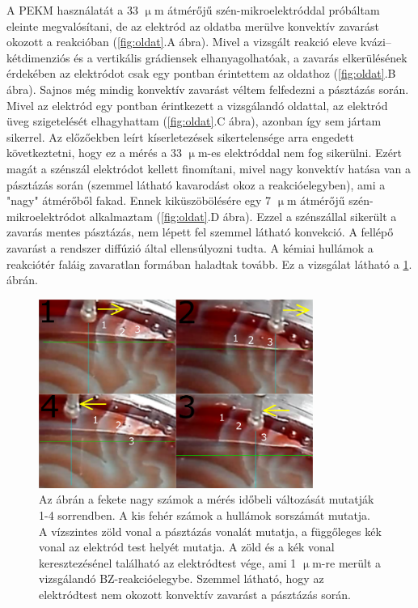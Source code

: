 A PEKM használatát a 33 $\upmu$m átmérőjű szén-mikroelektróddal próbáltam eleinte megvalósítani, de az elektród az oldatba merülve konvektív zavarást okozott a reakcióban (\ref{fig:oldat}.A ábra). Mivel a vizsgált reakció eleve kvázi--kétdimenziós és a vertikális grádiensek elhanyagolhatóak, a zavarás elkerülésének érdekében az elektródot csak egy pontban érintettem az oldathoz (\ref{fig:oldat}.B ábra). Sajnos még mindig konvektív zavarást véltem felfedezni a pásztázás során. Mivel az elektród egy pontban érintkezett a vizsgálandó oldattal, az elektród üveg szigetelését elhagyhattam (\ref{fig:oldat}.C ábra), azonban így sem jártam sikerrel. Az előzőekben leírt kíserletezések sikertelensége arra engedett következtetni, hogy ez a mérés a 33 $\upmu$m-es elektróddal nem fog sikerülni. Ezért magát a szénszál elektródot kellett finomítani, mivel nagy konvektív hatása van a pásztázás során (szemmel látható kavarodást okoz a reakcióelegyben), ami a "nagy" átmérőből fakad. Ennek kiküszöbölésére egy 7 $\upmu$m átmérőjű szén-mikroelektródot alkalmaztam (\ref{fig:oldat}.D ábra). Ezzel a szénszállal sikerült a zavarás mentes pásztázás, nem lépett fel szemmel látható konvekció. A fellépő zavarást a rendszer diffúzió által ellensúlyozni tudta. A kémiai hullámok a reakciótér faláig zavaratlan formában haladtak tovább. Ez a  vizsgálat látható a \ref{fig:secmkep}. ábrán.
\begin{figure}
\centering
\includegraphics[width=0.8\textwidth]{img/secmkep.png}
\caption{Az ábrán a fekete nagy számok a mérés időbeli változását mutatják 1-4 sorrendben. A kis fehér számok a hullámok sorszámát mutatja. A vízszintes zöld vonal a pásztázás vonalát mutatja, a függőleges kék vonal az elektród test helyét mutatja. A zöld és a kék vonal keresztezésénel található az elektródtest vége, ami 1 $\upmu$m-re merült a vizsgálandó BZ-reakcióelegybe. Szemmel látható, hogy az elektródtest nem okozott konvektív zavarást a pásztázás során.}
\label{fig:secmkep}
\end{figure}
